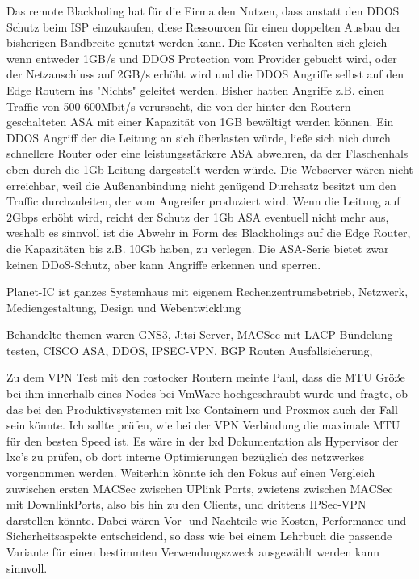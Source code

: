 \documentclass[english,runningheads,a4paper]{llncs}[2018/03/10]
\begin{document}
Das remote Blackholing hat für die Firma den Nutzen, dass anstatt den DDOS Schutz beim ISP einzukaufen, diese Ressourcen für einen doppelten Ausbau der bisherigen Bandbreite genutzt werden kann. Die Kosten verhalten sich gleich wenn entweder  1GB/s und DDOS Protection vom Provider gebucht wird, oder der Netzanschluss auf 2GB/s erhöht wird und die DDOS Angriffe selbst auf den Edge Routern ins "Nichts" geleitet werden. Bisher hatten Angriffe z.B. einen Traffic von 500-600Mbit/s verursacht, die von der hinter den Routern geschalteten ASA mit einer Kapazität von 1GB bewältigt werden können. Ein DDOS Angriff der die Leitung an sich überlasten würde, ließe sich nich durch schnellere Router oder eine leistungsstärkere ASA abwehren, da der Flaschenhals eben durch die 1Gb Leitung dargestellt werden würde. Die Webserver wären nicht erreichbar, weil die Außenanbindung  nicht genügend Durchsatz besitzt um den Traffic durchzuleiten, der vom Angreifer produziert wird. Wenn die Leitung auf 2Gbps erhöht wird, reicht der Schutz der 1Gb ASA eventuell nicht mehr aus, weshalb es sinnvoll ist die Abwehr in Form des Blackholings auf die Edge Router, die Kapazitäten bis z.B. 10Gb haben, zu verlegen. Die ASA-Serie bietet zwar keinen DDoS-Schutz, aber kann Angriffe erkennen und sperren.

Planet-IC ist ganzes Systemhaus mit eigenem Rechenzentrumsbetrieb, Netzwerk, Mediengestaltung, Design und Webentwicklung

Behandelte themen waren GNS3, Jitsi-Server, MACSec mit LACP Bündelung testen, CISCO ASA, DDOS, IPSEC-VPN, BGP Routen Ausfallsicherung,

Zu dem VPN Test mit den rostocker Routern meinte Paul, dass die MTU Größe bei ihm innerhalb eines Nodes bei VmWare hochgeschraubt wurde und fragte, ob das bei den Produktivsystemen mit lxc Containern und Proxmox auch der Fall sein könnte. Ich sollte prüfen, wie bei der VPN Verbindung die maximale MTU für den besten Speed ist. Es wäre in der lxd Dokumentation als Hypervisor der lxc's zu prüfen, ob dort interne Optimierungen bezüglich des netzwerkes vorgenommen werden.
Weiterhin könnte ich den Fokus auf einen Vergleich zuwischen ersten MACSec zwischen UPlink Ports, zwietens zwischen MACSec mit DownlinkPorts, also bis hin zu den Clients, und drittens IPSec-VPN darstellen könnte. Dabei wären Vor- und Nachteile wie Kosten, Performance und Sicherheitsaspekte entscheidend, so dass wie bei einem Lehrbuch die passende Variante für einen bestimmten Verwendungszweck ausgewählt werden kann sinnvoll.
\end{document}
